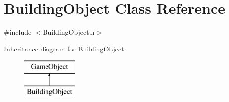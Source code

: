 \hypertarget{class_building_object}{}\section{Building\+Object Class Reference}
\label{class_building_object}


{\ttfamily \#include $<$Building\+Object.\+h$>$}

Inheritance diagram for Building\+Object\+:\begin{figure}[H]
\begin{center}
\leavevmode
\includegraphics[height=2.000000cm]{class_building_object}
\end{center}
\end{figure}
